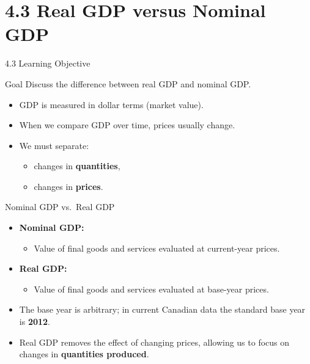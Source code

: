 \documentclass[aspectratio=169]{beamer}
\begin{document}
\section{4.3 Real GDP versus Nominal GDP}

\begin{frame}{4.3 Learning Objective}
\transfade
\begin{block}{Goal}
Discuss the difference between real GDP and nominal GDP.
\end{block}
\begin{itemize}[<+->]
  \item GDP is measured in dollar terms (market value).
  \item When we compare GDP over time, prices usually \alert{change}.
  \item We must separate:
  \begin{itemize}[<+->]
    \item changes in \textbf{quantities},
    \item changes in \textbf{prices}.
  \end{itemize}
\end{itemize}
\end{frame}

\begin{frame}{Nominal GDP vs.\ Real GDP}
\transfade
\begin{itemize}[<+->]
  \item \textbf{Nominal GDP:}
  \begin{itemize}[<+->]
    \item Value of final goods and services \alert{evaluated at current-year prices}.
  \end{itemize}
  \item \textbf{Real GDP:}
  \begin{itemize}[<+->]
    \item Value of final goods and services \alert{evaluated at base-year prices}.
  \end{itemize}
  \item The base year is arbitrary; in current Canadian data the standard base year is \textbf{2012}.
  \item Real GDP removes the effect of changing prices, allowing us to focus on changes in \textbf{quantities produced}.
\end{itemize}
\end{frame}
\end{document}
